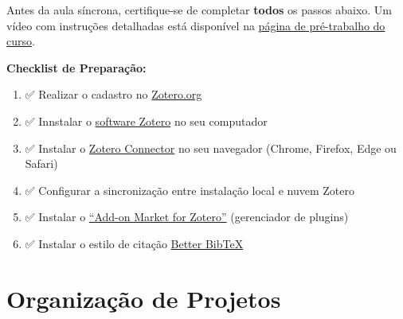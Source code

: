 \documentclass[
  a4paper,
]{book}
\providecommand{\tightlist}{%
  \setlength{\itemsep}{0pt}\setlength{\parskip}{0pt}}\usepackage{longtable,booktabs,array}
\newcommand{\emojitext}[1]{{\emoji #1}}
\begin{document}
\begin{tcolorbox}[enhanced jigsaw, colback=white, toptitle=1mm, opacityback=0, left=2mm, rightrule=.15mm, title=\textcolor{quarto-callout-important-color}{\faExclamation}\hspace{0.5em}{Pré-requisitos}, coltitle=black, opacitybacktitle=0.6, breakable, toprule=.15mm, bottomtitle=1mm, titlerule=0mm, bottomrule=.15mm, arc=.35mm, leftrule=.75mm, colframe=quarto-callout-important-color-frame, colbacktitle=quarto-callout-important-color!10!white]

Antes da aula síncrona, certifique-se de completar \textbf{todos} os
passos abaixo. Um vídeo com instruções detalhadas está disponível na
\hyperref[sec-zoteroprework]{página de pré-trabalho do curso}.

\vspace{10pt}

\textbf{Checklist de Preparação:}

\vspace{10pt}

\begin{enumerate}
\def\labelenumi{\arabic{enumi}.}
\tightlist
\item
  \emojitext{✅} Realizar o cadastro no
  \href{https://www.zotero.org/user/register}{Zotero.org}
\item
  \emojitext{✅} Innstalar o
  \href{https://www.zotero.org/download/}{software Zotero} no seu
  computador
\item
  \emojitext{✅} Instalar o
  \href{https://www.zotero.org/download/}{Zotero Connector} no seu
  navegador (Chrome, Firefox, Edge ou Safari)
\item
  \emojitext{✅} Configurar a sincronização entre instalação local e
  nuvem Zotero
\item
  \emojitext{✅} Instalar o
  \href{https://github.com/syt2/zotero-addons}{``Add-on Market for
  Zotero''} (gerenciador de plugins)
\item
  \emojitext{✅} Instalar o estilo de citação
  \href{https://retorque.re/zotero-better-bibtex/citing/migrating/}{Better
  BibTeX}
\end{enumerate}

\end{tcolorbox}


\chapter{Organização de Projetos}\label{sec-project}
\end{document}
